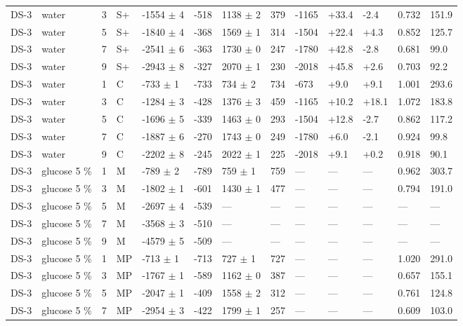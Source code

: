 \documentclass[11pt,a4paper]{article}
\begin{document}
\begin{landscape}
{\begin{longtable}{@{}lllllllllllll@{}}
DS-3 & water & 3 & S+ & -1554 $\pm$ 4 & -518 & 1138 $\pm$ 2 & 379 & -1165 & +33.4 & -2.4 & 0.732 & 151.9 \\
DS-3 & water & 5 & S+ & -1840 $\pm$ 4 & -368 & 1569 $\pm$ 1 & 314 & -1504 & +22.4 & +4.3 & 0.852 & 125.7 \\
DS-3 & water & 7 & S+ & -2541 $\pm$ 6 & -363 & 1730 $\pm$ 0 & 247 & -1780 & +42.8 & -2.8 & 0.681 & 99.0 \\
DS-3 & water & 9 & S+ & -2943 $\pm$ 8 & -327 & 2070 $\pm$ 1 & 230 & -2018 & +45.8 & +2.6 & 0.703 & 92.2 \\
DS-3 & water & 1 & C & -733 $\pm$ 1 & -733 & 734 $\pm$ 2 & 734 & -673 & +9.0 & +9.1 & 1.001 & 293.6 \\
DS-3 & water & 3 & C & -1284 $\pm$ 3 & -428 & 1376 $\pm$ 3 & 459 & -1165 & +10.2 & +18.1 & 1.072 & 183.8 \\
DS-3 & water & 5 & C & -1696 $\pm$ 5 & -339 & 1463 $\pm$ 0 & 293 & -1504 & +12.8 & -2.7 & 0.862 & 117.2 \\
DS-3 & water & 7 & C & -1887 $\pm$ 6 & -270 & 1743 $\pm$ 0 & 249 & -1780 & +6.0 & -2.1 & 0.924 & 99.8 \\
DS-3 & water & 9 & C & -2202 $\pm$ 8 & -245 & 2022 $\pm$ 1 & 225 & -2018 & +9.1 & +0.2 & 0.918 & 90.1 \\
DS-3 & glucose 5 \% & 1 & M & -789 $\pm$ 2 & -789 & 759 $\pm$ 1 & 759 & --- & --- & --- & 0.962 & 303.7 \\
DS-3 & glucose 5 \% & 3 & M & -1802 $\pm$ 1 & -601 & 1430 $\pm$ 1 & 477 & --- & --- & --- & 0.794 & 191.0 \\
DS-3 & glucose 5 \% & 5 & M & -2697 $\pm$ 4 & -539 & --- & --- & --- & --- & --- & --- & --- \\
DS-3 & glucose 5 \% & 7 & M & -3568 $\pm$ 3 & -510 & --- & --- & --- & --- & --- & --- & --- \\
DS-3 & glucose 5 \% & 9 & M & -4579 $\pm$ 5 & -509 & --- & --- & --- & --- & --- & --- & --- \\
DS-3 & glucose 5 \% & 1 & MP & -713 $\pm$ 1 & -713 & 727 $\pm$ 1 & 727 & --- & --- & --- & 1.020 & 291.0 \\
DS-3 & glucose 5 \% & 3 & MP & -1767 $\pm$ 1 & -589 & 1162 $\pm$ 0 & 387 & --- & --- & --- & 0.657 & 155.1 \\
DS-3 & glucose 5 \% & 5 & MP & -2047 $\pm$ 1 & -409 & 1558 $\pm$ 2 & 312 & --- & --- & --- & 0.761 & 124.8 \\
DS-3 & glucose 5 \% & 7 & MP & -2954 $\pm$ 3 & -422 & 1799 $\pm$ 1 & 257 & --- & --- & --- & 0.609 & 103.0 \\

\end{longtable}}
\end{landscape}
\end{document}
